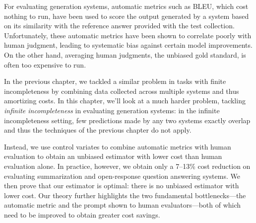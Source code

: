 For evaluating generation systems, automatic metrics such as BLEU, which cost nothing to run, have been used to score the output generated by a system based on its similarity with the reference answer provided with the test collection.
Unfortunately, these automatic metrics have been shown to correlate poorly with human judgment, leading to systematic bias against certain model improvements.
On the other hand, averaging human judgments, the unbiased gold standard, is often too expensive to run.

In the previous chapter, we tackled a similar problem in tasks with finite incompleteness by combining data collected across multiple systems and thus amortizing costs.
In this chapter, we'll look at a much harder problem, tackling \textit{infinite incompleteness} in evaluating generation systems:
in the infinite incompleteness setting, few predictions made by any two systems exactly overlap and thus the techniques of the previous chapter do not apply.

Instead, we use control variates to combine automatic metrics with human evaluation to
obtain an unbiased estimator with lower cost than human evaluation alone.
In practice, however, we obtain only a 7--13\% cost reduction on evaluating summarization and open-response question answering systems.
We then prove that our estimator is optimal: there is no unbiased estimator with lower cost.
Our theory further highlights the two fundamental bottlenecks---the automatic
metric and the prompt shown to human evaluators---both of which need to be improved to obtain greater cost savings.
